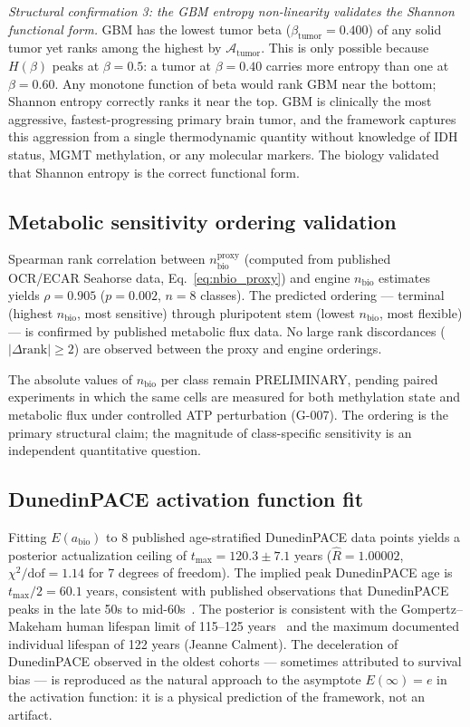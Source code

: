 \documentclass[12pt,a4paper]{article}
\newcommand{\nbio}{n_{\mathrm{bio}}}
\newcommand{\Ascore}{\mathcal{A}}
\begin{document}
\textit{Structural confirmation 3: the GBM entropy non-linearity validates the
Shannon functional form.} GBM has the lowest tumor beta ($\beta_{\mathrm{tumor}} =
0.400$) of any solid tumor yet ranks among the highest by $\Ascore_{\mathrm{tumor}}$.
This is only possible because $H(\beta)$ peaks at $\beta = 0.5$: a tumor at
$\beta = 0.40$ carries more entropy than one at $\beta = 0.60$. Any monotone
function of beta would rank GBM near the bottom; Shannon entropy correctly
ranks it near the top. GBM is clinically the most aggressive, fastest-progressing
primary brain tumor, and the framework captures this aggression from a single
thermodynamic quantity without knowledge of IDH status, MGMT methylation,
or any molecular markers. The biology validated that Shannon entropy is the
correct functional form.

\subsection{Metabolic sensitivity ordering validation}
\label{sec:nbio_results}

Spearman rank correlation between $\nbio^{\mathrm{proxy}}$ (computed from
published OCR/ECAR Seahorse data, Eq.~\ref{eq:nbio_proxy}) and engine
$\nbio$ estimates yields $\rho = 0.905$ ($p = 0.002$, $n = 8$ classes).
The predicted ordering --- terminal (highest $\nbio$, most sensitive) through
pluripotent stem (lowest $\nbio$, most flexible) --- is confirmed by published
metabolic flux data. No large rank discordances ($|\Delta \mathrm{rank}| \geq 2$)
are observed between the proxy and engine orderings.

The absolute values of $\nbio$ per class remain PRELIMINARY, pending paired
experiments in which the same cells are measured for both methylation state
and metabolic flux under controlled ATP perturbation (G-007). The ordering
is the primary structural claim; the magnitude of class-specific sensitivity
is an independent quantitative question.

\subsection{DunedinPACE activation function fit}
\label{sec:eabio_results}

Fitting $E(a_{\mathrm{bio}})$ to 8 published age-stratified DunedinPACE
data points yields a posterior actualization ceiling of $t_{\max} = 120.3
\pm 7.1$ years ($\hat{R} = 1.00002$, $\chi^2/\mathrm{dof} = 1.14$ for 7
degrees of freedom). The implied peak DunedinPACE age is $t_{\max}/2 =
60.1$ years, consistent with published observations that DunedinPACE
peaks in the late 50s to mid-60s~\cite{Belsky2022}. The posterior is
consistent with the Gompertz--Makeham human lifespan limit of 115--125
years~\cite{Gompertz1825} and the maximum documented individual lifespan
of 122 years (Jeanne Calment). The deceleration of DunedinPACE observed
in the oldest cohorts --- sometimes attributed to survival bias --- is
reproduced as the natural approach to the asymptote $E(\infty) = e$ in the
activation function: it is a physical prediction of the framework, not an
artifact.
\end{document}
